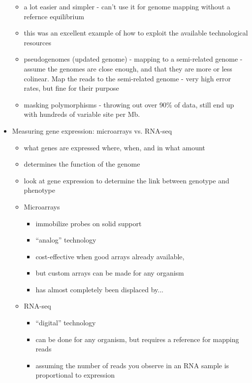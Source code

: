 \documentclass{article}
\begin{document}
\begin{itemize}
        \begin{itemize}
            \item a lot easier and simpler - can't use it for genome mapping without a refernce equilibrium
            \item this was an excellent example of how to exploit the available technological resources
            \item pseudogenomes (updated genome) - mapping to a semi-related genome - assume the genomes are close enough, and that they are more or less colinear.  Map the reads to the semi-related genome - very high error rates, but fine for their purpose
            \item masking polymorphisms - throwing out over 90\% of data, still end up with hundreds of variable site per Mb.
        \end{itemize}
        \item Measuring gene expression: microarrays vs. RNA-seq
        \begin{itemize}
            \item what genes are expressed where, when, and in what amount
            \item determines the function of the genome
            \item look at gene expression to determine the link between genotype and phenotype
            \item Microarrays
            \begin{itemize}
                \item immobilize probes on solid support
                \item ``analog'' technology
                \item cost-effective when good arrays already available,
                \item but custom arrays can be made for any organism
                \item has almost completely been displaced by...
            \end{itemize}
            \item RNA-seq
            \begin{itemize}
                \item ``digital'' technology
                \item can be done for any organism, but requires a reference for mapping reads
                \item assuming the number of reads you observe in an RNA sample is proportional to expression

\end{itemize}
\end{itemize}
\end{itemize}
\end{document}
